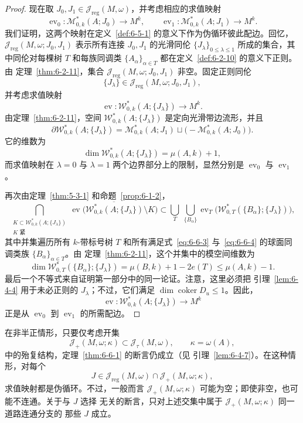 \begin{proof}
现在取 $J_0,J_1\in\mathcal J_{\mathrm{reg}}(M,\omega)$，并考虑相应的求值映射
\[
  \operatorname{ev}_0:\mathcal M^*_{0,k}(A;J_0)\longrightarrow M^k,
  \qquad
  \operatorname{ev}_1:\mathcal M^*_{0,k}(A;J_1)\longrightarrow M^k.
\]
我们证明，这两个映射在定义~\ref{def:6-5-1} 的意义下作为伪循环彼此配边。回忆，
$\mathcal J_{\mathrm{reg}}(M,\omega;J_0,J_1)$ 表示所有连接 $J_0,J_1$ 的光滑同伦
$\{J_\lambda\}_{0\le\lambda\le1}$ 所成的集合，其中同伦对每棵树 $T$ 和每族同调类
$\{A_\alpha\}_{\alpha\in T}$ 都在定义~\ref{def:6-2-10} 的意义下正则。由
定理~\ref{thm:6-2-11}，集合
$\mathcal J_{\mathrm{reg}}(M,\omega;J_0,J_1)$ 非空。固定正则同伦
\[
  \{J_\lambda\}\in
  \mathcal J_{\mathrm{reg}}(M,\omega;J_0,J_1),
\]
并考虑求值映射
\[
  \operatorname{ev}:
  \mathcal W^*_{0,k}(A;\{J_\lambda\})
  \longrightarrow M^k.
\]
由定理~\ref{thm:6-2-11}，空间
$\mathcal W^*_{0,k}(A;\{J_\lambda\})$ 是定向光滑带边流形，并且
\[
  \partial\mathcal W^*_{0,k}(A;\{J_\lambda\})
  =
  \mathcal M^*_{0,k}(A;J_1)
  \sqcup\bigl(-\mathcal M^*_{0,k}(A;J_0)\bigr).
\]
它的维数为
\[
  \dim\mathcal W^*_{0,k}(A;\{J_\lambda\})
  =\mu(A,k)+1,
\]
而求值映射在 $\lambda=0$ 与 $\lambda=1$ 两个边界部分上的限制，显然分别是
$\operatorname{ev}_0$ 与 $\operatorname{ev}_1$。

再次由定理~\ref{thm:5-3-1} 和命题~\ref{prop:6-1-2}，
\[
  \bigcap_{\substack{
    K\subset\mathcal W^*_{0,k}(A;\{J_\lambda\})\\K\text{ 紧}}}
  \overline{\operatorname{ev}
  \bigl(\mathcal W^*_{0,k}(A;\{J_\lambda\})\setminus K\bigr)}
  \subset
  \bigcup_T\ \bigcup_{\{B_\alpha\}}
  \operatorname{ev}_T
  \bigl(\mathcal W^*_{0,T}(\{B_\alpha\};\{J_\lambda\})\bigr),
\]
其中并集遍历所有 $k$-带标号树 $T$ 和所有满足式~\eqref{eq:6-6-3}
与~\eqref{eq:6-6-4} 的球面同调类族 $\{B_\alpha\}_{\alpha\in T}$。由
定理~\ref{thm:6-2-11}，这个并集中的模空间维数为
\[
  \dim\mathcal W^*_{0,T}(\{B_\alpha\};\{J_\lambda\})
  =\mu(B,k)+1-2e(T)
  \le\mu(A,k)-1.
\]
最后一个不等式来自证明第一部分中的同一论证。注意，这里必须把
引理~\ref{lem:6-4-4} 用于未必正则的 $J_\lambda$；不过，它们满足
$\dim\operatorname{coker}D_u\le1$。因此，
\[
  \operatorname{ev}:
  \mathcal W^*_{0,k}(A;\{J_\lambda\})\longrightarrow M^k
\]
正是从 $\operatorname{ev}_0$ 到 $\operatorname{ev}_1$ 的所需配边。
\end{proof}

\begin{remark}\label{rem:6-6-2}
在非半正情形，只要仅考虑开集
\[
  \mathcal J_+(M,\omega;\kappa)
  \subset\mathcal J_\tau(M,\omega),
  \qquad \kappa=\omega(A),
\]
中的殆复结构，定理~\ref{thm:6-6-1} 的断言仍成立（见
引理~\ref{lem:6-4-7}）。在这种情形，对每个
\[
  J\in
  \mathcal J_{\mathrm{reg}}(M,\omega)
  \cap\mathcal J_+(M,\omega;\kappa),
\]
求值映射都是伪循环。不过，一般而言
$\mathcal J_+(M,\omega;\kappa)$ 可能为空；即使非空，也可能不连通。关于与 $J$ 选择
无关的断言，只对上述交集中属于 $\mathcal J_+(M,\omega;\kappa)$ 同一道路连通分支的
那些 $J$ 成立。
\end{remark}

